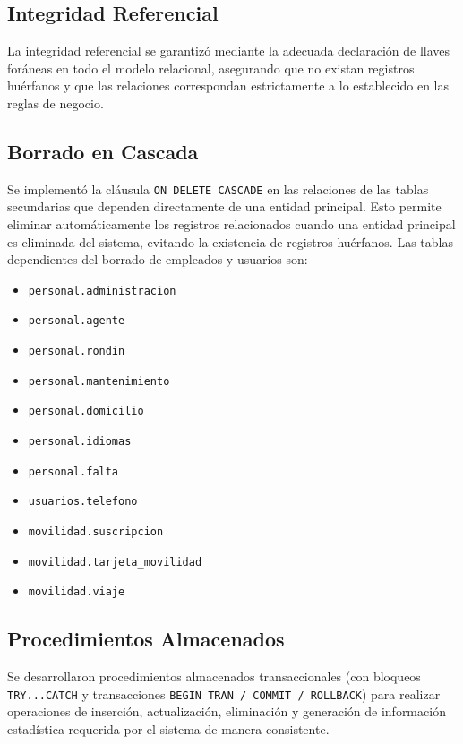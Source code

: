 \subsection{Integridad Referencial}

La integridad referencial se garantizó mediante la adecuada declaración de llaves foráneas en todo el modelo relacional, asegurando que no existan registros huérfanos y que las relaciones correspondan estrictamente a lo establecido en las reglas de negocio.

\subsection{Borrado en Cascada}

Se implementó la cláusula \texttt{ON DELETE CASCADE} en las relaciones de las tablas secundarias que dependen directamente de una entidad principal. Esto permite eliminar automáticamente los registros relacionados cuando una entidad principal es eliminada del sistema, evitando la existencia de registros huérfanos. Las tablas dependientes del borrado de empleados y usuarios son:
\begin{itemize}
	\item \texttt{personal.administracion}
	\item \texttt{personal.agente}
	\item \texttt{personal.rondin}
	\item \texttt{personal.mantenimiento}
	\item \texttt{personal.domicilio}
	\item \texttt{personal.idiomas}
	\item \texttt{personal.falta}
	\item \texttt{usuarios.telefono}
	\item \texttt{movilidad.suscripcion}
	\item \texttt{movilidad.tarjeta\_movilidad}
	\item \texttt{movilidad.viaje}
\end{itemize}

\subsection{Procedimientos Almacenados}

Se desarrollaron procedimientos almacenados transaccionales (con bloqueos \texttt{TRY...CATCH} y transacciones \texttt{BEGIN TRAN / COMMIT / ROLLBACK}) para realizar operaciones de inserción, actualización, eliminación y generación de información estadística requerida por el sistema de manera consistente.


